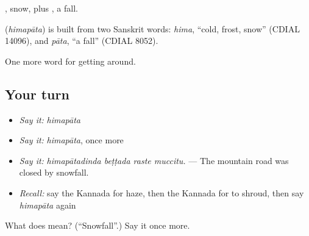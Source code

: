, snow, plus , a fall.

\begin{cousinweb}
\textbf{} (\emph{himapāta}) is built from two Sanskrit words: \emph{hima}, \textquotedblleft{}cold, frost, snow\textquotedblright{} (CDIAL 14096), and \emph{pāta}, \textquotedblleft{}a fall\textquotedblright{} (CDIAL 8052).
\end{cousinweb}

\begin{grammarlens}[title={What you've built}]
One more word for getting around.
\end{grammarlens}

\subsection*{Your turn}
\begin{itemize}
\raggedright
  \item \emph{Say it:} \emph{himapāta}
  \item \emph{Say it:} \emph{himapāta}, once more
  \item \emph{Say it:} \emph{himapātadinda beṭṭada raste muccitu.} — The mountain road was closed by snowfall.
  \item \emph{Recall:} say the Kannada for haze, then the Kannada for to shroud, then say \emph{himapāta} again
\end{itemize}

\begin{tcolorbox}[breakable,colback=teal!4,colframe=teal!35!black,title={Before you move on}]
What does  mean? (\textquotedblleft{}Snowfall\textquotedblright{}.) Say it once more.
\end{tcolorbox}

